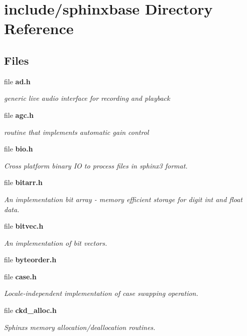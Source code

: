 \section{include/sphinxbase Directory Reference}
\label{dir_e3d154c296a8e9be2797a4f81e9375b2}
\subsection*{Files}
\begin{DoxyCompactItemize}
\item 
file {\bf ad.\+h}
\begin{DoxyCompactList}\small\item\em generic live audio interface for recording and playback \end{DoxyCompactList}\item 
file {\bf agc.\+h}
\begin{DoxyCompactList}\small\item\em routine that implements automatic gain control \end{DoxyCompactList}\item 
file {\bf bio.\+h}
\begin{DoxyCompactList}\small\item\em Cross platform binary I\+O to process files in sphinx3 format. \end{DoxyCompactList}\item 
file {\bf bitarr.\+h}
\begin{DoxyCompactList}\small\item\em An implementation bit array -\/ memory efficient storage for digit int and float data. \end{DoxyCompactList}\item 
file {\bf bitvec.\+h}
\begin{DoxyCompactList}\small\item\em An implementation of bit vectors. \end{DoxyCompactList}\item 
file {\bfseries byteorder.\+h}
\item 
file {\bf case.\+h}
\begin{DoxyCompactList}\small\item\em Locale-\/independent implementation of case swapping operation. \end{DoxyCompactList}\item 
file {\bf ckd\+\_\+alloc.\+h}
\begin{DoxyCompactList}\small\item\em Sphinx\textquotesingle{}s memory allocation/deallocation routines. \end{DoxyCompactList}\item 

\end{DoxyCompactItemize}
